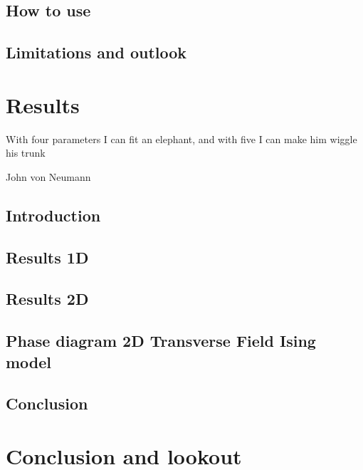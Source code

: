 \documentclass{book}
\newcounter{a}
\newcounter{b}
\begin{document}
\section{How to use}\label{sec:H5:source_code}


\section{Limitations and outlook}


\chapter{Results} \label{chap:results}

\epigraph{With four parameters I can fit an elephant, and with five I can make him wiggle his trunk}{John von Neumann}

%

\section{Introduction}


\section{Results 1D}\label{sec:results1d}


\section{Results 2D}\label{sec:results2d}


\section{Phase diagram 2D Transverse Field Ising model} \label{subsec:2dpahsediag}


\section{Conclusion}


\chapter{Conclusion and lookout}






\clearpage{\thispagestyle{empty}\cleardoublepage}
\end{document}
